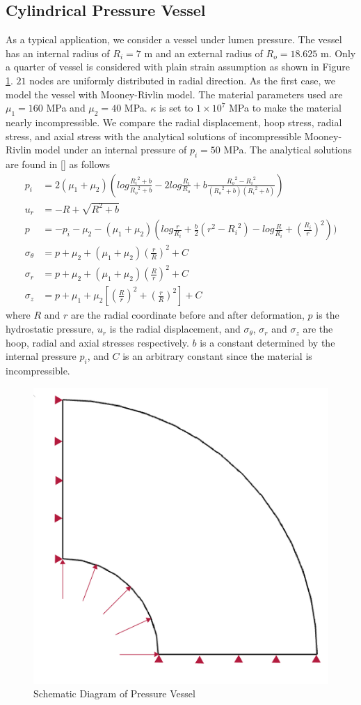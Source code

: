 \subsection{Cylindrical Pressure Vessel}
\label{pressure_vessel}
As a typical application, we consider a vessel under lumen pressure. The vessel has an internal radius of $R_i = 7$ m and an external radius of $R_o = 18.625$ m. Only a quarter of vessel is considered with plain strain assumption as shown in Figure \ref{fig:vessel_schematic}. $21$ nodes are uniformly distributed in radial direction. As the first case, we model the vessel with Mooney-Rivlin model. The material parameters used are $\mu_1 = 160$ MPa and $\mu_2 = 40$ MPa. $\kappa$ is set to $1 \times 10^7$ MPa to make the material nearly incompressible. We compare the radial displacement, hoop stress, radial stress, and axial stress with the analytical solutions of incompressible Mooney-Rivlin model under an internal pressure of $p_i = 50$ MPa. The analytical solutions are found in [] as follows 
\begin{subequations}
\begin{align}
p_i &= 2(\mu_1 + \mu_2)(log\frac{{R_i}^2 + b}{{R_o}^2 + b} - 2log\frac{R_i}{R_o} +
b\frac{{R_o}^2 - {R_i}^2}{({R_o}^2+b)({R_i}^2+b)}) \\
u_r &= -R + \sqrt{R^2 + b} \\
p &= - p_i - \mu_2 - (\mu_1 + \mu_2)(log\frac{r}{R_i} + \frac{b}{2}(r^2 - {R_i}^2) - log\frac{R}{R_i} + {(\frac{R_i}{r})}^2) ) \\
\sigma_{\theta} &= p + \mu_2 + (\mu_1 + \mu_2)(\frac{r}{R})^2 + C \\
\sigma_r &= p + \mu_2 + (\mu_1 + \mu_2)(\frac{R}{r})^2 + C \\
\sigma_z &= p +  \mu_1 + \mu_2[(\frac{R}{r})^2 + (\frac{r}{R})^2] + C
\end{align}
\end{subequations}
where $R$ and $r$ are the radial coordinate before and after deformation, $p$ is the hydrostatic pressure, $u_r$ is the radial displacement, and $\sigma_{\theta}$, $\sigma_r$ and $\sigma_z$ are the hoop, radial and axial stresses respectively. $b$ is a constant determined by the internal pressure $p_i$, and $C$ is an arbitrary constant since the material is incompressible. 

\begin{figure}[h!]
\centering
\includegraphics[width=.3\textwidth]{./figures/vessel_schematic.jpg}
\caption{Schematic Diagram of Pressure Vessel}
\label{fig:vessel_schematic}
\end{figure}

